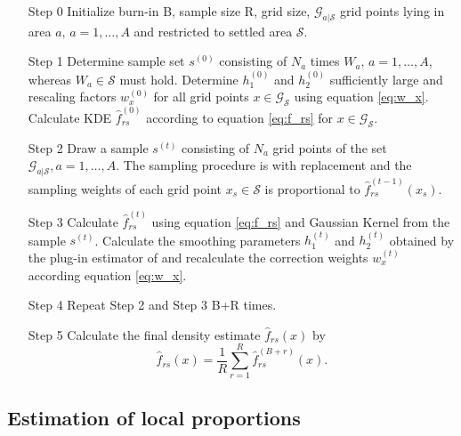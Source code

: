 \begin{itemize}
    \item[Step 0] Initialize burn-in B, sample size R, grid size, $\mathcal{G}_{a|\mathcal{S}}$ grid points lying in area $a,\, a = 1, \dots, A$ and restricted to settled area $\mathcal{S}$.
    \item[Step 1] Determine sample set $s^{(0)}$ consisting of $N_a$ times $W_a,\, a = 1, \dots,A$, whereas $W_a \in \mathcal{S}$ must hold. Determine $h_1^{(0)}$ and $h_2^{(0)}$ sufficiently large and rescaling factors $w_x^{(0)}$ for all grid points $x \in \mathcal{G}_{\mathcal{S}}$ using equation \ref{eq:w_x}. Calculate KDE $\hat{f}_{rs}^{(0)}$ according to equation \ref{eq:f_rs} for $x \in \mathcal{G}_{\mathcal{S}}$. 
    \item[Step 2] Draw a sample $s^{(t)}$ consisting of $N_a$ grid points of the set $\mathcal{G}_{a|\mathcal{S}}, a = 1, \dots, A$. The sampling procedure is with replacement and the sampling weights of each grid point $x_s \in \mathcal{S}$ is proportional to $\hat{f}_{rs}^{(t-1)}(x_s)$. 
    \item[Step 3] Calculate $\hat{f}_{rs}^{(t)}$ using equation \ref{eq:f_rs} and Gaussian Kernel from the sample $s^{(t)}$. Calculate the smoothing parameters $h_1^{(t)}$ and $h_2^{(t)}$ obtained by the plug-in estimator of \cite{Wand94} and recalculate the correction weights $w_x^{(t)}$ according equation \ref{eq:w_x}. 
    \item[Step 4] Repeat Step 2 and Step 3 B+R times. 
    \item[Step 5] Calculate the final density estimate $\hat{f}_{rs}(x)$ by
    $$ \hat{f}_{rs}(x) = \frac{1}{R} \sum_{r = 1}^R \hat{f}_{rs}^{(B+r)}(x).$$
\end{itemize}

\hypertarget{Estimation-of-local-proportions}{%
\subsection{Estimation of local proportions}\label{Estimation-of-local-proportions}}

